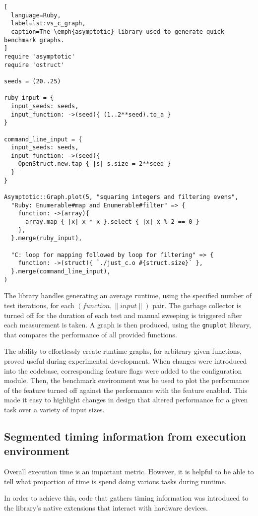 \begin{lstlisting}[
  language=Ruby,
  label=lst:vs_c_graph,
  caption=The \emph{asymptotic} library used to generate quick benchmark graphs.
]
require 'asymptotic'
require 'ostruct'

seeds = (20..25)

ruby_input = {
  input_seeds: seeds,
  input_function: ->(seed){ (1..2**seed).to_a }
}

command_line_input = {
  input_seeds: seeds,
  input_function: ->(seed){
    OpenStruct.new.tap { |s| s.size = 2**seed }
  }
}

Asymptotic::Graph.plot(5, "squaring integers and filtering evens",
  "Ruby: Enumerable#map and Enumerable#filter" => {
    function: ->(array){
      array.map { |x| x * x }.select { |x| x % 2 == 0 } 
    },
  }.merge(ruby_input),

  "C: loop for mapping followed by loop for filtering" => {
    function: ->(struct){ `./just_c.o #{struct.size}` },
  }.merge(command_line_input),
)
\end{lstlisting}

The library handles generating an average runtime, using the specified number of test iterations, for each $(function, \|input\|)$ pair.
The garbage collector is turned off for the duration of each test and manual sweeping is triggered after each measurement is taken.
A graph is then produced, using the \verb|gnuplot| library, that compares the performance of all provided functions.

The ability to effortlessly create runtime graphs, for arbitrary given functions, proved useful during experimental development.
When changes were introduced into the codebase, corresponding feature flags were added to the configuration module.
Then, the benchmark environment was be used to plot the performance of the feature turned off against the performance with the feature enabled.
This made it easy to highlight changes in design that altered performance for a given task over a variety of input sizes.

\subsection{Segmented timing information from execution environment}
Overall execution time is an important metric. However, it is helpful to be able to tell what proportion of time is spend doing various tasks during runtime.

In order to achieve this, code that gathers timing information was introduced to the library's native extensions that interact with hardware devices.

